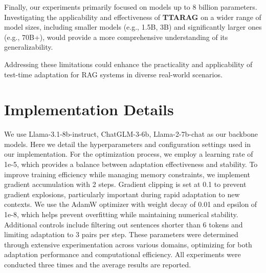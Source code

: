 \documentclass{article}
\newcommand{\ourmethod}{{\fontfamily{lmtt}\selectfont \textbf{TTARAG}}\xspace}
\begin{document}
Finally, our experiments primarily focused on models up to 8 billion parameters. Investigating the applicability and effectiveness of \ourmethod on a wider range of model sizes, including smaller models (e.g., 1.5B, 3B) and significantly larger ones (e.g., 70B+), would provide a more comprehensive understanding of its generalizability.

Addressing these limitations could enhance the practicality and applicability of test-time adaptation for RAG systems in diverse real-world scenarios.
\fi








\iffalse
\section{Implementation Details}
We use Llama-3.1-8b-instruct, ChatGLM-3-6b, Llama-2-7b-chat as our backbone models.  Here we detail the hyperparameters and configuration settings used in our implementation. For the optimization process, we employ a learning rate of 1e-5, which provides a balance between adaptation effectiveness and stability. To improve training efficiency while managing memory constraints, we implement gradient accumulation with 2 steps. Gradient clipping is set at 0.1 to prevent gradient explosions, particularly important during rapid adaptation to new contexts. We use the AdamW optimizer with weight decay of 0.01 and epsilon of 1e-8, which helps prevent overfitting while maintaining numerical stability. Additional controls include filtering out sentences shorter than 6 tokens and limiting adaptation to 3 pairs per step. These parameters were determined through extensive experimentation across various domains, optimizing for both adaptation performance and computational efficiency. All experiments were conducted three times and the average results are reported.
\end{document}
